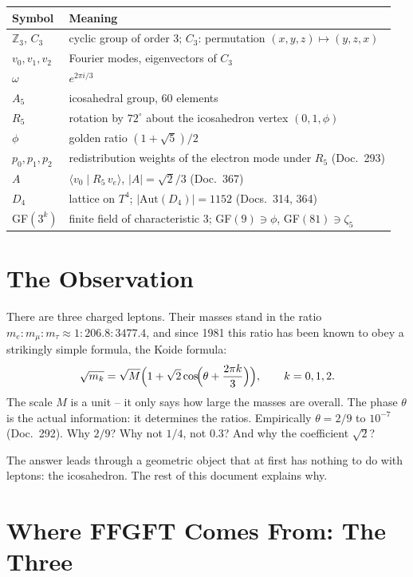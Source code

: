 \medskip
\begin{tabular}{@{}lp{11cm}@{}}
\toprule
\textbf{Symbol} & \textbf{Meaning} \\
\midrule
$\mathbb{Z}_3$, $C_3$ & cyclic group of order 3; $C_3$: permutation $(x,y,z)\mapsto(y,z,x)$ \\
$v_0,v_1,v_2$ & Fourier modes, eigenvectors of $C_3$ \\
$\omega$ & $e^{2\pi i/3}$ \\
$A_5$ & icosahedral group, 60 elements \\
$R_5$ & rotation by $72^\circ$ about the icosahedron vertex $(0,1,\phi)$ \\
$\phi$ & golden ratio $(1+\sqrt5)/2$ \\
$p_0,p_1,p_2$ & redistribution weights of the electron mode under $R_5$ (Doc.~293) \\
$A$ & $\langle v_0\mid R_5\,v_e\rangle$, $|A|=\sqrt2/3$ (Doc.~367) \\
$D_4$ & lattice on $T^4$; $|\text{Aut}(D_4)|=1152$ (Docs.~314, 364) \\
GF$(3^k)$ & finite field of characteristic 3; GF$(9)\ni\phi$, GF$(81)\ni\zeta_5$ \\
\bottomrule
\end{tabular}

\section{The Observation}

There are three charged leptons. Their masses stand in the ratio
$m_e : m_\mu : m_\tau \approx 1 : 206{.}8 : 3477{.}4$, and since 1981 this
ratio has been known to obey a strikingly simple formula, the Koide formula:
\[
  \sqrt{m_k} = \sqrt{M}\Bigl(1 + \sqrt2\cos\!\Bigl(\theta + \frac{2\pi k}{3}\Bigr)\Bigr),
  \qquad k = 0,1,2.
\]
The scale $M$ is a unit -- it only says how large the masses are overall. The
phase $\theta$ is the actual information: it determines the ratios.
Empirically $\theta = 2/9$ to $10^{-7}$ (Doc.~292). Why $2/9$? Why not $1/4$,
not $0{.}3$? And why the coefficient $\sqrt2$?

The answer leads through a geometric object that at first has nothing to do
with leptons: the icosahedron. The rest of this document explains why.

\section{Where FFGFT Comes From: The Three}

